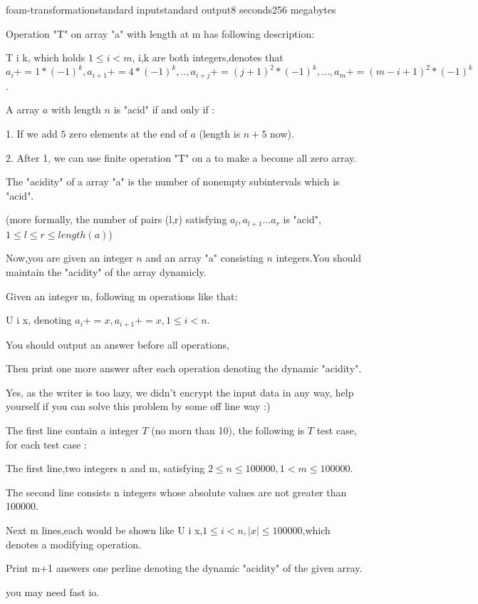 \begin{problem}{foam-transformation}{standard input}{standard output}{8 seconds}{256 megabytes}

Operation "T" on array "a" with length at m has following description:

T i k, which holds $1 \le i < m$, i,k are both integers,denotes that $a_i+=1*(-1)^k,a_{i+1}+=4*(-1)^k,..,a_{i+j}+=(j+1)^2*(-1)^k,...,a_{m}+=(m-i+1)^2*(-1)^k$.

A array $a$ with length $n$ is "acid" if and only if :

1. If we add $5$ zero elements at the end of $a$ (length is $n + 5$ now).

2. After 1, we can use finite operation "T" on a to make a become all zero array.

The "acidity" of a array "a" is the number of nonempty subintervals which is "acid".

(more formally, the number of pairs (l,r) satisfying $a_{l},a_{l+1}...a_{r}$ is "acid",$1 \le l \le r \le length(a)$)  

Now,you are given an integer $n$ and an array "a" consisting $n$ integers.You should maintain the "acidity" of the array dynamicly.

Given an integer m, following m operations like that:

U i x, denoting $a_i+=x,a_{i+1}+=x,1 \le i < n.$

You should output an answer before all operations,

Then print one more answer after each operation denoting the dynamic "acidity".

Yes, as the writer is too lazy, we didn't encrypt the input data in any way, help yourself if you can solve this problem by some off line way :)


\InputFile
The first line contain a integer $T$ (no morn than 10), the following is $T$ test case, for each test case :

The first line,two integers n and m, satisfying $2 \le n \le 100000,1 < m \le 100000$.

The second line consists n integers whose absolute values are not greater than 100000.

Next m lines,each would be shown like U i x,$1 \le i < n,|x| \le 100000$,which denotes a modifying operation. 

\OutputFile
Print m+1 answers one perline denoting the dynamic "acidity" of the given array.

\Example

\begin{example}
%
\end{example}

\Note
you may need fast io.

\end{problem}

